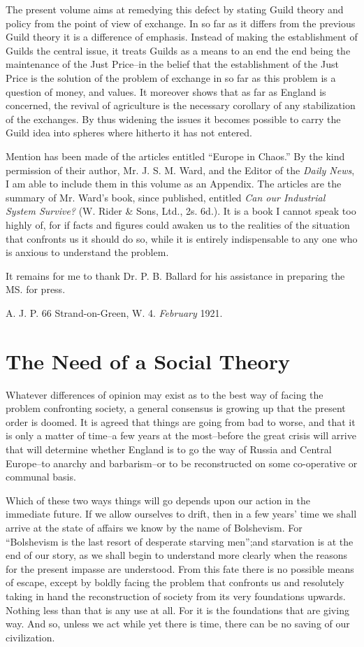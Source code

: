 \documentclass{book}
\begin{document}
The present volume aims at remedying this defect by stating Guild theory and policy from the point of view of exchange. In so far as it differs from the previous Guild theory it is a difference of emphasis. Instead of making the establishment of Guilds the central issue, it treats Guilds as a means to an end the end being the maintenance of the Just Price–in the belief that the establishment of the Just Price is the solution of the problem of exchange in so far as this problem is a question of money, and values. It moreover shows that as far as England is concerned, the revival of agriculture is the necessary corollary of any stabilization of the exchanges. By thus widening the issues it becomes possible to carry the Guild idea into spheres where hitherto it has not entered.

Mention has been made of the articles entitled “Europe in Chaos.” By the kind permission of their author, Mr. J. S. M. Ward, and the Editor of the \emph{Daily News}, I am able to include them in this volume as an Appendix. The articles are the summary of Mr. Ward’s book, since published, entitled \emph{Can our Industrial System Survive?} (W. Rider \& Sons, Ltd., 2s. 6d.). It is a book I cannot speak too highly of, for if facts and figures could awaken us to the realities of the situation that confronts us it should do so, while it is entirely indispensable to any one who is anxious to understand the problem.

It remains for me to thank Dr. P. B. Ballard for his assistance in preparing the MS. for press.

A. J. P. 66 Strand-on-Green, W. 4. \emph{February} 1921.

\chapter{The Need of a Social Theory}
\label{chapter-1}
Whatever differences of opinion may exist as to the best way of facing the problem confronting society, a general consensus is growing up that the present order is doomed. It is agreed that things are going from bad to worse, and that it is only a matter of time–a few years at the most–before the great crisis will arrive that will determine whether England is to go the way of Russia and Central Europe–to anarchy and barbarism–or to be reconstructed on some co-operative or communal basis.

Which of these two ways things will go depends upon our action in the immediate future. If we allow ourselves to drift, then in a few years’ time we shall arrive at the state of affairs we know by the name of Bolshevism. For “Bolshevism is the last resort of desperate starving men”;\footnotemark[1] and starvation is at the end of our story, as we shall begin to understand more clearly when the reasons for the present impasse are understood. From this fate there is no possible means of escape, except by boldly facing the problem that confronts us and resolutely taking in hand the reconstruction of society from its very foundations upwards. Nothing less than that is any use at all. For it is the foundations that are giving way. And so, unless we act while yet there is time, there can be no saving of our civilization.
\end{document}
